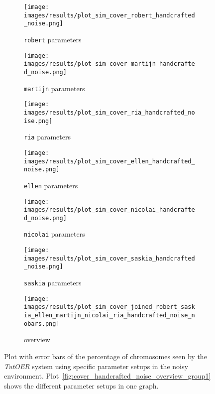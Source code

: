 \begin{figure}[ht]
	\begin{subfigure}{0.48\linewidth}
	\texttt{[image: images/results/plot\_sim\_cover\_robert\_handcrafted\_noise.png]}
	\caption{\texttt{robert} parameters}
	\label{fig:cover_handcrafted_noise_robert}
	\end{subfigure}
	\hfill
	\begin{subfigure}{0.48\linewidth}
	\texttt{[image: images/results/plot\_sim\_cover\_martijn\_handcrafted\_noise.png]}
	\caption{\texttt{martijn} parameters}
	\label{fig:cover_handcrafted_noise_martijn}
	\end{subfigure}
	\begin{subfigure}{0.48\linewidth}
	\texttt{[image: images/results/plot\_sim\_cover\_ria\_handcrafted\_noise.png]}
	\caption{\texttt{ria} parameters}
	\label{fig:cover_handcrafted_noise_ria}
	\end{subfigure}
	\hfill
	\begin{subfigure}{0.48\linewidth}
	\texttt{[image: images/results/plot\_sim\_cover\_ellen\_handcrafted\_noise.png]}
	\caption{\texttt{ellen} parameters}
	\label{fig:cover_handcrafted_noise_ellen}
	\end{subfigure}
	\begin{subfigure}{0.48\linewidth}
	\texttt{[image: images/results/plot\_sim\_cover\_nicolai\_handcrafted\_noise.png]}
	\caption{\texttt{nicolai} parameters}
	\label{fig:cover_handcrafted_noise_nicolai}
	\end{subfigure}
	\hfill
	\begin{subfigure}{0.48\linewidth}
	\texttt{[image: images/results/plot\_sim\_cover\_saskia\_handcrafted\_noise.png]}
	\caption{\texttt{saskia} parameters}
	\label{fig:cover_handcrafted_noise_saskia}
	\end{subfigure}
	\begin{subfigure}{\linewidth}
	\texttt{[image: images/results/plot\_sim\_cover\_joined\_robert\_saskia\_ellen\_martijn\_nicolai\_ria\_handcrafted\_noise\_nobars.png]}
	\caption{overview}
	\label{fig:cover_handcrafted_noise_overview_group2}
	\end{subfigure}
	\caption[Percentage chromosomes seen in noisy simulated environment for
	group 1]{Plot with error bars of the percentage of chromosomes seen by the \emph{TutOER}
	system using specific parameter setups in the noisy environment.
	Plot~\ref{fig:cover_handcrafted_noise_overview_group1} shows the
	different parameter setups in one graph.}
	\label{fig:cover_handcrafted_noise_container_group2}
\end{figure}
